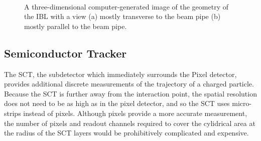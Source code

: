 \begin{figure}[hbtp]
\centering
{}\\
\caption{A three-dimensional computer-generated image of the geometry of the \ac{IBL} with a view (a) mostly transverse to the beam pipe (b) mostly parallel to the beam pipe.}
\label{fig:ibl_geometry}
\end{figure}

\subsection{Semiconductor Tracker}

The \ac{SCT}, the subdetector which immediately surrounds the Pixel detector, provides additional discrete measurements of the trajectory of a charged particle.
Because the \ac{SCT} is further away from the interaction point, the spatial resolution does not need to be as high as in the pixel detector, and so the \ac{SCT} uses micro-strips instead of pixels. 
Although pixels provide a more accurate measurement, the number of pixels and readout channels required to cover the cylidrical area at the radius of the \ac{SCT} layers would be prohibitively complicated and expensive.

